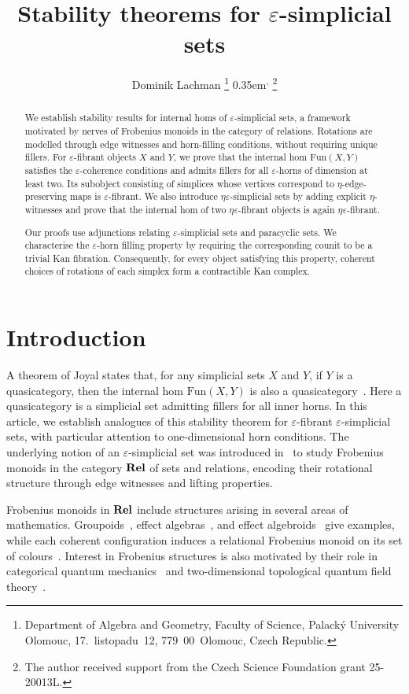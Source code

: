 \documentclass{article}
\title{Stability theorems for \(\varepsilon\)-simplicial sets}
\author{Dominik Lachman%
\thanks{Department of Algebra and Geometry,
Faculty of Science, Palack\'y University Olomouc,
17.~listopadu~12, 779~00~Olomouc, Czech Republic.}%
\kern0.35em\textsuperscript{,}%
\thanks{The author received support from the Czech Science Foundation grant 25-20013L.}}
\date{}
\theoremstyle{plain}
\theoremstyle{definition}
\theoremstyle{remark}
\begin{document}
\maketitle
\begin{abstract}
We establish stability results for internal homs of
$\varepsilon$-simplicial sets, a framework motivated by
nerves of Frobenius monoids in the category of relations.
Rotations are modelled through edge witnesses and
horn-filling conditions, without requiring unique fillers.
For $\varepsilon$-fibrant objects $X$ and $Y$, we prove
that the internal hom $\mathrm{Fun}(X,Y)$ satisfies
the $\varepsilon$-coherence conditions and admits fillers
for all $\varepsilon$-horns of dimension at least two.
Its subobject consisting of simplices whose vertices
correspond to $\eta$-edge-preserving maps is
$\varepsilon$-fibrant.
We also introduce $\eta\varepsilon$-simplicial sets
by adding explicit $\eta$-witnesses and prove that
the internal hom of two $\eta\varepsilon$-fibrant
objects is again $\eta\varepsilon$-fibrant.

Our proofs use adjunctions relating
$\varepsilon$-simplicial sets and paracyclic sets.
We characterise the $\varepsilon$-horn filling property
by requiring the corresponding counit to be a trivial
Kan fibration.
Consequently, for every object satisfying this property,
coherent choices of rotations of each simplex form
a contractible Kan complex.
\end{abstract}

\section{Introduction}

A theorem of Joyal states that, for any simplicial sets $X$ and $Y$,
if $Y$ is a quasicategory, then the internal hom $\mathrm{Fun}(X,Y)$
is also a quasicategory~\cite[Corollary~2.19]{Joyal2008}.
Here a quasicategory is a simplicial set admitting fillers for all
inner horns. In this article, we establish analogues of this stability
theorem for $\varepsilon$-fibrant $\varepsilon$-simplicial sets,
with particular attention to one-dimensional horn conditions.
The underlying notion of an $\varepsilon$-simplicial set was introduced
in~\cite{Lachman2026} to study Frobenius monoids in the category
$\mbox{\bf Rel}$ of sets and relations, encoding their rotational structure
through edge witnesses and lifting properties.

Frobenius monoids in $\mbox{\bf Rel}$ include structures arising in several
areas of mathematics. Groupoids~\cite{HCC2013},
effect algebras~\cite{PS,Lachman2026}, and
effect algebroids~\cite{Roumen2017,Lachman2026} give examples,
while each coherent configuration induces a relational Frobenius
monoid on its set of colours~\cite{JJL2025,Lachman2026}.
Interest in Frobenius structures is also motivated by their role
in categorical quantum mechanics~\cite{HV} and two-dimensional
topological quantum field theory~\cite{Kock2003}.
\end{document}
